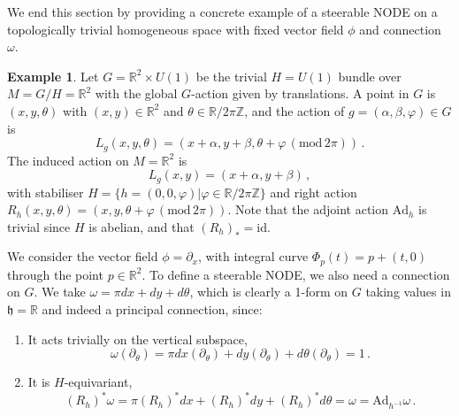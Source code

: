 \documentclass[12pt,a4paper]{article}
\numberwithin{equation}{section}
\newcommand{\id}{\mathrm{id}}
\newcommand{\R}{\mathbb{R}}
\newcommand{\Z}{\mathbb{Z}}
\theoremstyle{plain}
\theoremstyle{definition}
\newtheorem{example}[theorem]{Example}
\theoremstyle{remark}
\begin{document}
We end this section by providing a concrete example of a steerable NODE on a topologically trivial homogeneous space with fixed vector field $\phi$ and connection $\omega$.
\begin{example}\label{ex:steerabl_NODE}
    Let $G = \R^2 \times U(1)$ be the trivial $H=U(1)$ bundle over $M=G/H=\R^2$ with the global $G$-action given by translations. A point in $G$ is $(x,y,\theta)$ with $(x,y)\in \R^2$ and $\theta\in \R/2\pi\Z$, and the action of $g=(\alpha,\beta,\varphi) \in G$ is
    \begin{equation}\label{eqn:counterex_left_action_G}
        L_g(x,y,\theta) = (x+\alpha,y+\beta,\theta+\varphi\,(\mathrm{mod}\, 2\pi))\,.
    \end{equation}
    The induced action on $M=\R^2$ is
    \begin{equation}\label{eqn:counterex_left_action_M}
        L_g(x,y) = (x+\alpha,y+\beta)\,,
    \end{equation}
    with stabiliser $H = \{h = (0,0,\varphi) | \varphi \in \R/2\pi\Z\}$ and right action $R_h(x,y,\theta) = (x,y,\theta+\varphi\,(\mathrm{mod}\, 2\pi))$. Note that the adjoint action $\mathrm{Ad}_{h}$ is trivial since $H$ is abelian, and that $(R_h)_* = \id$.

    We consider the vector field $\phi= \partial_x$, with integral curve $\Phi_p(t) = p + (t,0)$ through the point $p \in \R^2$. To define a steerable NODE, we also need a connection on $G$. We take $\omega = \pi dx + dy + d\theta$, which is clearly a 1-form on $G$ taking values in $\mathfrak{h} = \R$ and indeed a principal connection, since:
    \begin{enumerate}
        \item[(i)] It acts trivially on the vertical subspace,
        \begin{equation}
            \omega(\partial_{\theta}) = \pi dx(\partial_{\theta}) + dy(\partial_{\theta}) + d\theta(\partial_{\theta}) = 1 \,.
        \end{equation}
        \item[(ii)] It is $H$-equivariant,
        \begin{equation}
            (R_h)^*\omega = \pi(R_h)^*dx + (R_h)^*dy + (R_h)^*d\theta = \omega =  \mathrm{Ad}_{h^{-1}}\omega\,. 
        \end{equation}
    \end{enumerate}


\end{example}
\end{document}
